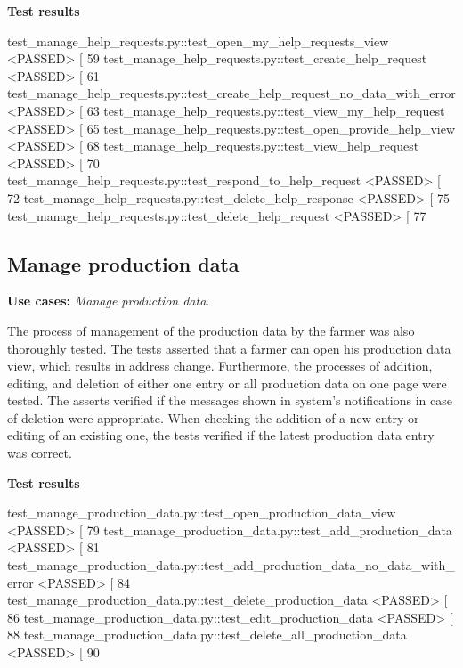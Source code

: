 \textbf{Test results}
\begin{verbnobox}[\footnotesize \vbdelim]
test_manage_help_requests.py::test_open_my_help_requests_view <PASSED>             [ 59%
test_manage_help_requests.py::test_create_help_request <PASSED>                    [ 61%
test_manage_help_requests.py::test_create_help_request_no_data_with_error <PASSED> [ 63%
test_manage_help_requests.py::test_view_my_help_request <PASSED>                   [ 65%
test_manage_help_requests.py::test_open_provide_help_view <PASSED>                 [ 68%
test_manage_help_requests.py::test_view_help_request <PASSED>                      [ 70%
test_manage_help_requests.py::test_respond_to_help_request <PASSED>                [ 72%
test_manage_help_requests.py::test_delete_help_response <PASSED>                   [ 75%
test_manage_help_requests.py::test_delete_help_request <PASSED>                    [ 77%
\end{verbnobox}

\subsection{Manage production data}

\textbf{Use cases:} \textit{Manage production data}.

The process of management of the production data by the farmer was also thoroughly tested. The tests asserted that a farmer can open his production data view, which results in address change. Furthermore, the processes of addition, editing, and deletion of either one entry or all production data on one page were tested. The asserts verified if the messages shown in system's notifications in case of deletion were appropriate. When checking the addition of a new entry or editing of an existing one, the tests verified if the latest production data entry was correct.

\textbf{Test results}
\begin{verbnobox}[\footnotesize \vbdelim]
test_manage_production_data.py::test_open_production_data_view <PASSED>              [ 79%
test_manage_production_data.py::test_add_production_data <PASSED>                    [ 81%
test_manage_production_data.py::test_add_production_data_no_data_with_error <PASSED> [ 84%
test_manage_production_data.py::test_delete_production_data <PASSED>                 [ 86%
test_manage_production_data.py::test_edit_production_data <PASSED>                   [ 88%
test_manage_production_data.py::test_delete_all_production_data <PASSED>             [ 90%
\end{verbnobox}

